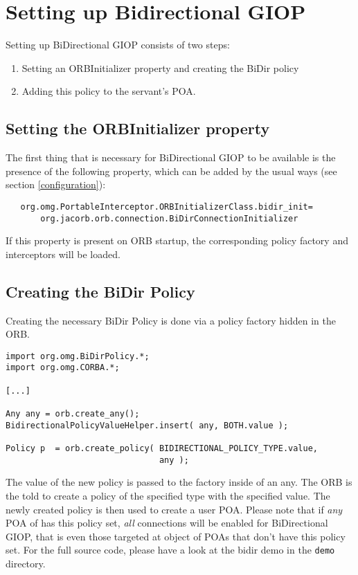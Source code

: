 \documentclass[12pt]{scrbook}
\begin{document}
\section{Setting up Bidirectional GIOP}

Setting up BiDirectional GIOP consists of two steps:
\begin{enumerate}
\item Setting an ORBInitializer property and  creating the BiDir policy
\item Adding this policy to the servant's POA.
\end{enumerate}

\subsection{Setting the ORBInitializer property}

The first thing that is necessary for BiDirectional GIOP to be available is
the presence of the following property, which can be added by the usual ways
(see section \ref{configuration}):

\begin{verbatim}
   org.omg.PortableInterceptor.ORBInitializerClass.bidir_init= 
       org.jacorb.orb.connection.BiDirConnectionInitializer
\end{verbatim}

If this property is present on ORB startup, the corresponding policy factory
and interceptors will be loaded. 


\subsection{Creating the BiDir Policy}
Creating the necessary BiDir Policy is done via a policy factory hidden in the
ORB. 

\begin{verbatim}
import org.omg.BiDirPolicy.*;
import org.omg.CORBA.*;

[...]

Any any = orb.create_any();
BidirectionalPolicyValueHelper.insert( any, BOTH.value );

Policy p  = orb.create_policy( BIDIRECTIONAL_POLICY_TYPE.value,
                               any );
\end{verbatim}

The value of the new policy is passed to the factory inside of an any. The ORB
is the told to create a policy of the specified type with the specified
value. The newly created policy is then used to create a user POA. Please note
that if {\em any} POA of has this policy set, {\em all} connections will be
enabled for BiDirectional GIOP, that is even those targeted at object of POAs
that don't have this policy set. For the full source code, please have a look
at the bidir demo in the {\tt demo} directory.
\end{document}
